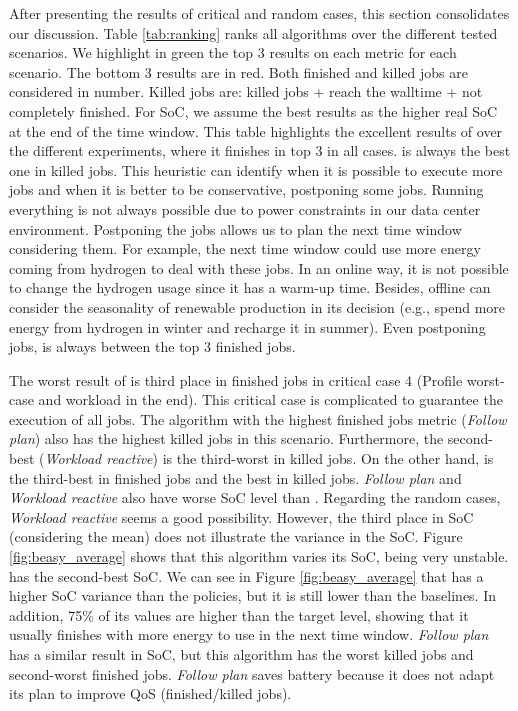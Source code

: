 After presenting the results of critical and random cases, this section consolidates our discussion. Table \ref{tab:ranking} ranks all algorithms over the different tested scenarios. We highlight in green the top 3 results on each metric for each scenario. The bottom 3 results are in red. Both finished and killed jobs are considered in number. Killed jobs are: killed jobs + reach the walltime + not completely finished. For SoC, we assume the best results as the higher real SoC at the end of the time window. This table highlights the excellent results of \emph{\systemName} over the different experiments, where it finishes in top 3 in all cases. \emph{\systemName} is always the best one in killed jobs. This heuristic can identify when it is possible to execute more jobs and when it is better to be conservative, postponing some jobs. Running everything is not always possible due to power constraints in our data center environment. Postponing the jobs allows us to plan the next time window considering them. For example, the next time window could use more energy coming from hydrogen to deal with these jobs. In an online way, it is not possible to change the hydrogen usage since it has a warm-up time. Besides, offline can consider the seasonality of renewable production in its decision (e.g., spend more energy from hydrogen in winter and recharge it in summer). Even postponing jobs, \emph{\systemName} is always between the top 3 finished jobs. 

The worst result of \emph{\systemName} is third place in finished jobs in critical case 4 (Profile worst-case and workload in the end). This critical case is complicated to guarantee the execution of all jobs. The algorithm with the highest finished jobs metric (\emph{Follow plan}) also has the highest killed jobs in this scenario. Furthermore, the second-best (\emph{Workload reactive}) is the third-worst in killed jobs. On the other hand, \emph{\systemName} is the third-best in finished jobs and the best in killed jobs. \emph{Follow plan} and \emph{Workload reactive} also have worse SoC level than \emph{\systemName}. Regarding the random cases, \emph{Workload reactive} seems a good possibility. However, the third place in SoC (considering the mean) does not illustrate the variance in the SoC. Figure \ref{fig:beasy_average} shows that this algorithm varies its SoC, being very unstable. \emph{\systemName} has the second-best SoC. We can see in Figure \ref{fig:beasy_average} that \emph{\systemName} has a higher SoC variance than the policies, but it is still lower than the baselines. In addition, 75\% of its values are higher than the target level, showing that it usually finishes with more energy to use in the next time window. \emph{Follow plan} has a similar result in SoC, but this algorithm has the worst killed jobs and second-worst finished jobs. \emph{Follow plan} saves battery because it does not adapt its plan to improve QoS (finished/killed jobs). 

